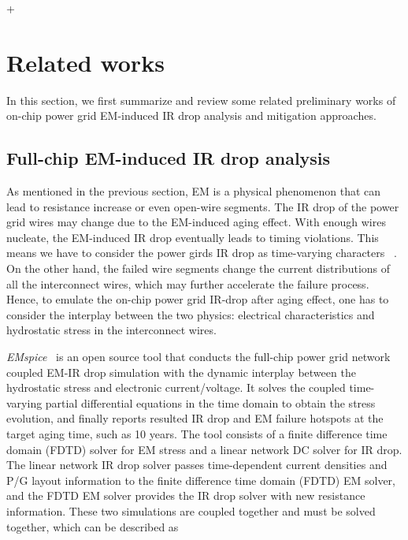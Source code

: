 +\section{Related works}
\label{sec:related}

In this section, we first summarize and review some related preliminary works of on-chip power grid EM-induced IR drop analysis and mitigation approaches.

\subsection{Full-chip EM-induced IR drop analysis}
\label{subsec:emspice}
As mentioned in the previous section, EM is a physical phenomenon that can lead to resistance increase or even open-wire segments.  The IR drop of the power grid wires may change due to the EM-induced aging effect. With enough wires nucleate, the EM-induced IR drop eventually leads to timing violations. This means we have to consider the power girds IR drop as time-varying characters ~\cite{SunYu:TDMR'20, Huang:TCAD'15, Chatterjee:2018TCAD,SukharevNajm:2018TDMR}. 
On the other hand, the failed wire segments change the current distributions of all the interconnect wires, which may further accelerate the failure process. Hence, to emulate the on-chip power grid IR-drop after aging effect, one has to consider the interplay between the two physics: electrical characteristics and hydrostatic stress in the interconnect wires.

{\it EMspice}~\cite{SunYu:TDMR'20,EMspiceSourceCode} is an open source tool that conducts the full-chip power grid network coupled EM-IR drop simulation with the dynamic interplay between the hydrostatic stress and electronic current/voltage. It solves the coupled time-varying partial differential equations in the time domain to obtain the stress evolution, and finally reports resulted IR drop and EM failure hotspots at the target aging time, such as 10 years.  The tool consists of a finite difference time domain (FDTD) solver for EM stress and a linear network DC solver for IR drop. The linear network IR drop solver passes time-dependent current densities and P/G layout information to the finite difference time domain (FDTD) EM solver, and the FDTD EM solver provides the IR drop solver with new resistance information. These two simulations are coupled together and must be solved together, which can be described as


